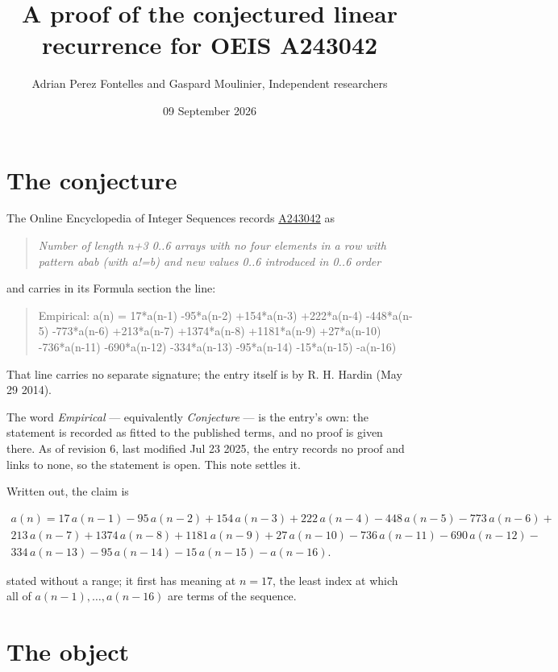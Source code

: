 \documentclass[11pt]{article}
\title{A proof of the conjectured linear recurrence for OEIS A243042}
\author{Adrian Perez Fontelles and Gaspard Moulinier, Independent researchers}
\date{09 September 2026}
\theoremstyle{definition}
\begin{document}
\maketitle
\section{The conjecture}

The Online Encyclopedia of Integer Sequences records \href{https://oeis.org/A243042}{A243042} as

\begin{quote}\itshape Number of length n+3 0..6 arrays with no four elements in a row with pattern abab (with a!=b) and new values 0..6 introduced in 0..6 order\end{quote}

and carries in its Formula section the line:

\begin{quote}\ttfamily Empirical: a(n) = 17*a(n-1) -95*a(n-2) +154*a(n-3) +222*a(n-4) -448*a(n-5) -773*a(n-6) +213*a(n-7) +1374*a(n-8) +1181*a(n-9) +27*a(n-10) -736*a(n-11) -690*a(n-12) -334*a(n-13) -95*a(n-14) -15*a(n-15) -a(n-16)\end{quote}

That line carries no separate signature; the entry itself is by R. H. Hardin (May 29 2014).

The word {\itshape Empirical} --- equivalently {\itshape Conjecture} --- is the entry's own: the statement is recorded as fitted to the published terms, and no proof is given there. As of revision 6, last modified Jul 23 2025, the entry records no proof and links to none, so the statement is open. This note settles it.

Written out, the claim is

\begin{multline*} a(n) = 17\,a(n-1) - 95\,a(n-2) + 154\,a(n-3) + 222\,a(n-4) - 448\,a(n-5) - 773\,a(n-6) + \\ 213\,a(n-7) + 1374\,a(n-8) + 1181\,a(n-9) + 27\,a(n-10) - 736\,a(n-11) - 690\,a(n-12) - \\ 334\,a(n-13) - 95\,a(n-14) - 15\,a(n-15) - a(n-16). \end{multline*}

stated without a range; it first has meaning at $n = 17$, the least index at which all of $a(n-1),\dots,a(n-16)$ are terms of the sequence.

\section{The object}
\end{document}

